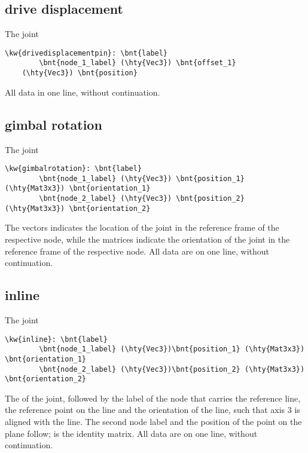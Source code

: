 \subsection{drive displacement}
The  joint
\begin{Verbatim}[commandchars=\\\{\}]
    \kw{drivedisplacementpin}: \bnt{label}
        \bnt{node_1_label} (\hty{Vec3}) \bnt{offset_1}
	(\hty{Vec3}) \bnt{position}
\end{Verbatim}
All data in one line, without continuation.

\subsection{gimbal rotation}
The  joint
\begin{Verbatim}[commandchars=\\\{\}]
    \kw{gimbalrotation}: \bnt{label}
        \bnt{node_1_label} (\hty{Vec3}) \bnt{position_1} (\hty{Mat3x3}) \bnt{orientation_1}
        \bnt{node_2_label} (\hty{Vec3}) \bnt{position_2} (\hty{Mat3x3}) \bnt{orientation_2}
\end{Verbatim}
The  vectors indicates the location of the joint
in the reference frame of the respective node,
while the  matrices indicate the orientation of the joint
in the reference frame of the respective node.
All data are on one line, without continuation.

\subsection{inline}
The  joint
\begin{Verbatim}[commandchars=\\\{\}]
    \kw{inline}: \bnt{label}
        \bnt{node_1_label} (\hty{Vec3})\bnt{position_1} (\hty{Mat3x3}) \bnt{orientation_1}
        \bnt{node_2_label} (\hty{Vec3})\bnt{position_2} (\hty{Mat3x3}) \bnt{orientation_2}
\end{Verbatim}
The  of the joint, followed by the label of the node
that carries the reference line, the reference point 
on the line and the orientation  of the line,
such that axis 3 is aligned with the line.
The second node label and the position of the point on the plane
follow;  is the identity matrix.
All data are on one line, without continuation.

